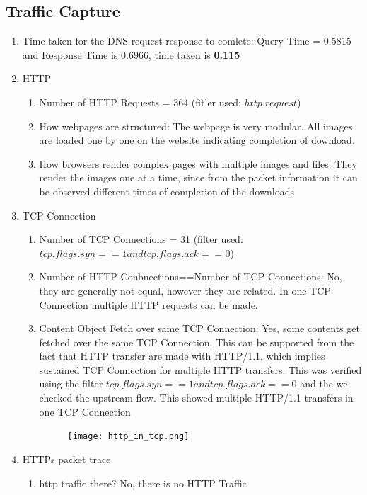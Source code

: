 \documentclass[12pt]{article}
\begin{document}
\subsection{Traffic Capture}
\renewcommand{\labelenumi}{\Alph{enumi}}
\begin{enumerate}
    \item Time taken for the DNS request-response to comlete: Query Time = 0.5815 and Response Time is 0.6966, time taken is \textbf{0.115}
    \item HTTP
    \begin{enumerate}
        \item Number of HTTP Requests = 364 (fitler used: $http.request$)
        \item How webpages are structured: The webpage is very modular. All images are loaded one by one on the website indicating completion of download.
        \item How browsers render complex pages with multiple images and files: They render the images one at a time, since from the packet information it can be observed different times of completion of the downloads
    \end{enumerate}
    \item TCP Connection
    \begin{enumerate}
        \item Number of TCP Connections = 31 (filter used: $tcp.flags.syn == 1 and tcp.flags.ack == 0$)
        \item Number of HTTP Conbnections==Number of TCP Connections: No, they are generally not equal, however they are related. In one TCP Connection multiple HTTP requests can be made.
        \item Content Object Fetch over same TCP Connection: Yes, some contents get fetched over the same TCP Connection. This can be supported from the fact that HTTP transfer are made with HTTP/1.1, which implies sustained TCP Connection for multiple HTTP transfers. This was verified using the filter $tcp.flags.syn==1 and tcp.flags.ack==0$ and the we checked the upstream flow. This showed multiple HTTP/1.1 transfers in one TCP Connection
        \begin{figure}[h!]
            \centering
            \texttt{[image: http\_in\_tcp.png]}
        \end{figure}
    \end{enumerate}
    \item HTTPs packet trace
    \begin{enumerate}
        \item http traffic there? No, there is no HTTP Traffic

\end{enumerate}
\end{enumerate}
\end{document}
